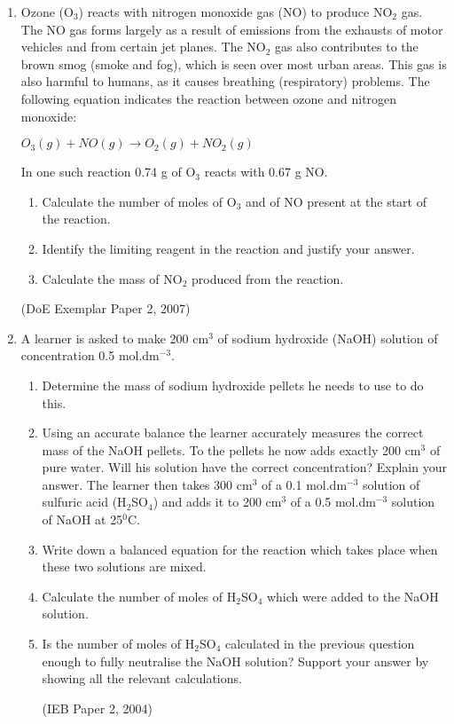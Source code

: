 \begin{eocexercises}{}
\begin{enumerate}
\item{Ozone (O$_{3}$) reacts with nitrogen monoxide gas (NO) to produce NO$_{2}$ gas. The NO gas forms largely as a result of emissions from the exhausts of motor vehicles and from certain jet planes. The NO$_{2}$ gas also contributes to the brown smog (smoke and fog), which is seen over most urban areas. This gas is also harmful to humans, as it causes breathing (respiratory) problems. The following equation indicates the reaction between ozone and nitrogen monoxide:
\begin{center}
\rm${O_{3}(g) + NO(g) \rightarrow O_{2}(g) + NO_{2}(g)}$
\end{center}
In one such reaction 0.74 g of O$_{3}$ reacts with 0.67 g NO.
	\begin{enumerate}
	\item{Calculate the number of moles of O$_{3}$ and of NO present at the start of the reaction.}
	\item{Identify the limiting reagent in the reaction and justify your answer.}
	\item{Calculate the mass of NO$_{2}$ produced from the reaction.}
	\end{enumerate}
(DoE Exemplar Paper 2, 2007)}
\item{A learner is asked to make 200 cm$^{3}$ of sodium hydroxide (NaOH) solution of concentration 0.5 mol.dm$^{-3}$.
	\begin{enumerate}
	\item{Determine the mass of sodium hydroxide pellets he needs to use to do this.}
	\item{Using an accurate balance the learner accurately measures the correct mass of the NaOH pellets. To the pellets he now adds exactly 200 cm$^{3}$ of pure water. Will his solution have the correct concentration? Explain your answer.
\newline
The learner then takes 300 cm$^{3}$ of a 0.1 mol.dm$^{-3}$ solution of sulfuric acid (H$_{2}$SO$_{4}$) and adds it to 200 cm$^{3}$ of a 0.5 mol.dm$^{-3}$ solution of NaOH at 25$^{0}$C.}
	\item{Write down a balanced equation for the reaction which takes place when these two solutions are mixed.}
	\item{Calculate the number of moles of H$_{2}$SO$_{4}$ which were added to the NaOH solution.}
	\item{Is the number of moles of H$_{2}$SO$_{4}$ calculated in the previous question enough to fully neutralise the NaOH solution? Support your answer by showing all the relevant calculations.}

(IEB Paper 2, 2004)
	\end{enumerate}
}
\end{enumerate}

\practiceinfo
\end{eocexercises}

